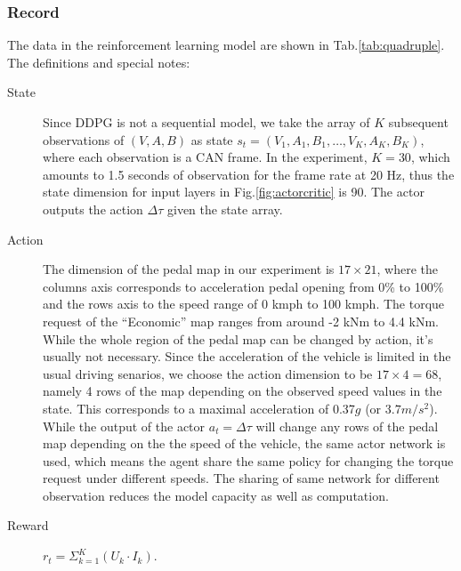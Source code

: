\documentclass{article}
\begin{document}
\subsubsection{Record}\label{sec:record}

The data in the reinforcement learning model are shown in Tab.\@\ref{tab:quadruple}. The definitions and special notes:

\begin{description}
	\item[State] Since DDPG is not a sequential model, we take the array of $K$ subsequent observations of $(V,A,B)$ as state $s_{t}=(V_{1},A_{1},B_{1},\ldots,V_{K},A_{K},B_{K})$, where each observation is a CAN frame. In the experiment, $K=30$, which amounts to 1.5 seconds of observation for the frame rate at 20 Hz, thus the state dimension for input layers in Fig.\@\ref{fig:actorcritic} is 90. The actor outputs the action $\Delta\tau$ given the state array.

	\item[Action] The dimension of the pedal map in our experiment is $17\times 21$, where the columns axis corresponds to acceleration pedal opening from 0\% to 100\% and the rows axis to the speed range of 0 kmph to 100 kmph. The torque request of the ``Economic'' map ranges from around -2 kNm to 4.4 kNm. While the whole region of the pedal map can be changed by action, it's usually not necessary. Since the acceleration of the vehicle is limited in the usual driving senarios, we choose the action dimension to be $17\times 4=68$, namely 4 rows of the map depending on the observed speed values in the state.  This corresponds to a maximal acceleration of 0.37$g$ (or $3.7m/s^{2}$). While the output of the actor $a_{t}=\Delta\tau$ will change any rows of the pedal map depending on the the speed of the vehicle, the same actor network is used, which means the agent share the same policy for changing the torque request under different speeds. The sharing of same network for different observation reduces the model capacity as well as computation.

	\item[Reward] $r_{t}=\Sigma_{k=1}^{K}(U_{k}\cdot I_{k})$.


\end{description}
\end{document}
